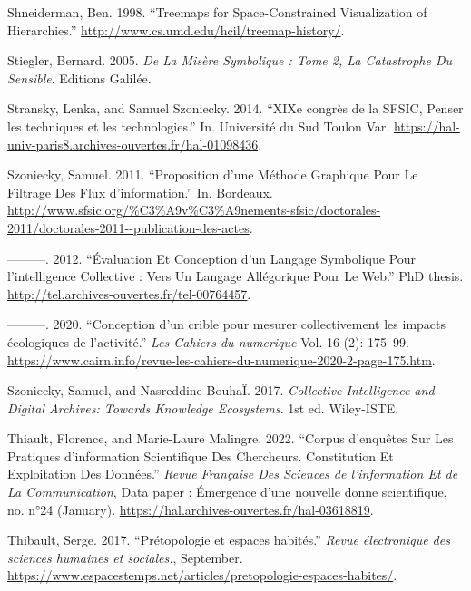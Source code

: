 \documentclass[
  letterpaper,
  DIV=11,
  numbers=noendperiod]{scrreprt}
\newlength{\cslhangindent}
\newlength{\cslentryspacingunit} %
\newenvironment{CSLReferences}[2] %
 {%
  \setlength{\parindent}{0pt}
  \ifodd #1
  \let\oldpar\par
  \def\par{\hangindent=\cslhangindent\oldpar}
  \fi
  \setlength{\parskip}{#2\cslentryspacingunit}
 }%
 {}
\begin{document}
\begin{CSLReferences}{1}{0}
\leavevmode{}%
Shneiderman, Ben. 1998. {``Treemaps for Space-Constrained Visualization
of Hierarchies.''} \url{http://www.cs.umd.edu/hcil/treemap-history/}.

\leavevmode{}%
Stiegler, Bernard. 2005. \emph{De La Misère Symbolique : Tome 2, La
Catastrophe Du Sensible}. Editions Galilée.

\leavevmode{}%
Stransky, Lenka, and Samuel Szoniecky. 2014. {``XIXe congrès de la
SFSIC, Penser les techniques et les technologies.''} In. Université du
Sud Toulon Var.
\url{https://hal-univ-paris8.archives-ouvertes.fr/hal-01098436}.

\leavevmode{}%
Szoniecky, Samuel. 2011. {``Proposition d'une Méthode Graphique Pour Le
Filtrage Des Flux d'information.''} In. Bordeaux.
\url{http://www.sfsic.org/\%C3\%A9v\%C3\%A9nements-sfsic/doctorales-2011/doctorales-2011--publication-des-actes}.

\leavevmode{}%
---------. 2012. {``Évaluation Et Conception d'un Langage Symbolique
Pour l'intelligence Collective : Vers Un Langage Allégorique Pour Le
Web.''} PhD thesis. \url{http://tel.archives-ouvertes.fr/tel-00764457}.

\leavevmode{}%
---------. 2020. {``Conception d{'}un crible pour mesurer collectivement
les impacts écologiques de l{'}activité.''} \emph{Les Cahiers du
numerique} Vol. 16 (2): 175--99.
\url{https://www.cairn.info/revue-les-cahiers-du-numerique-2020-2-page-175.htm}.

\leavevmode{}%
Szoniecky, Samuel, and Nasreddine BouhaÏ. 2017. \emph{Collective
Intelligence and Digital Archives: Towards Knowledge Ecosystems}. 1st
ed. Wiley-ISTE.

\leavevmode{}%
Thiault, Florence, and Marie-Laure Malingre. 2022. {``Corpus d'enquêtes
Sur Les Pratiques d'information Scientifique Des Chercheurs.
Constitution Et Exploitation Des Données.''} \emph{Revue Française Des
Sciences de l'information Et de La Communication}, Data paper :
Émergence d'une nouvelle donne scientifique, no. n°24 (January).
\url{https://hal.archives-ouvertes.fr/hal-03618819}.

\leavevmode{}%
Thibault, Serge. 2017. {``Prétopologie et espaces habités.''}
\emph{Revue électronique des sciences humaines et sociales.}, September.
\url{https://www.espacestemps.net/articles/pretopologie-espaces-habites/}.


\end{CSLReferences}
\end{document}
